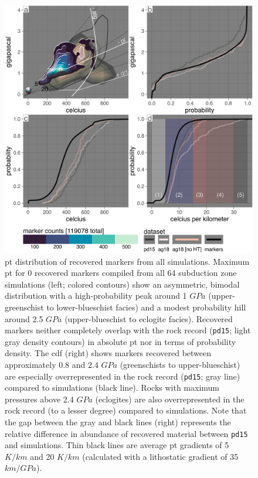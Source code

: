 \begin{figure}[htbp]

{\centering \includegraphics[width=1\linewidth,]{assets/figs/chpt4/marx_comp} 

}

\caption[\gls{pt} distribution of recovered markers from all simulations]{\gls{pt} distribution of recovered markers from all simulations. Maximum \gls{pt} for 0 recovered markers compiled from all 64 subduction zone simulations (left; colored contours) show an asymmetric, bimodal distribution with a high-probability peak around 1 \(GPa\) (upper-greenschist to lower-blueschist facies) and a modest probability hill around 2.5 \(GPa\) (upper-blueschist to eclogite facies). Recovered markers neither completely overlap with the rock record (\texttt{pd15}; light gray density contours) in absolute \gls{pt} nor in terms of probability density. The \gls{cdf} (right) shows markers recovered between approximately 0.8 and 2.4 \(GPa\) (greenschists to upper-blueschist) are especially overrepresented in the rock record (\texttt{pd15}; gray line) compared to simulations (black line). Rocks with maximum pressures above 2.4 \(GPa\) (eclogites) are also overrepresented in the rock record (to a lesser degree) compared to simulations. Note that the gap between the gray and black lines (right) represents the relative difference in abundance of recovered material between \texttt{pd15} and simulations. Thin black lines are average \gls{pt} gradients of 5 \(K/km\) and 20 \(K/km\) (calculated with a lithostatic gradient of 35 \(km/GPa\)).}\label{fig:meta}
\end{figure}

